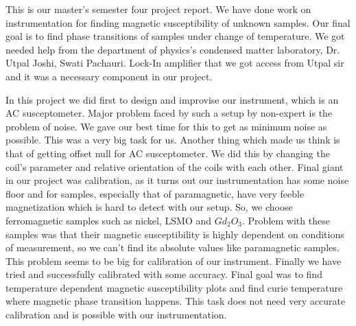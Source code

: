 This is our master’s semester four project report. We have done work on instrumentation for finding magnetic susceptibility of unknown samples. Our final goal is to find phase transitions of samples under change of temperature. We got needed help from the department of physics’s condensed matter laboratory, Dr. Utpal Joshi, Swati Pachauri. Lock-In amplifier that we got access from Utpal sir and it  was a necessary component in our project. 

In this project we did first to design and improvise our instrument, which is an AC susceptometer. Major problem faced by such a setup by non-expert is the problem of noise. We gave our best time for this to get as minimum noise as possible. This was a very big task for us. Another thing which made us think is that of getting offset null for AC susceptometer. We did this by changing the coil's parameter and relative orientation of the coils with each other. Final giant in our project was calibration, as it turns out our instrumentation has some noise floor and for samples, especially that of paramagnetic, have very feeble magnetization which is hard to detect with our setup. So, we choose ferromagnetic samples such as nickel, LSMO and $Gd_2O_3$. Problem with these samples was that their magnetic susceptibility is highly dependent on conditions of measurement, so we can’t find its absolute values like paramagnetic samples. This problem seems to be big for calibration of our instrument. Finally we have tried and successfully calibrated with some accuracy. Final goal was to find temperature dependent magnetic susceptibility plots and find curie temperature where magnetic phase transition happens. This task does not need very accurate calibration and is possible with our instrumentation.
